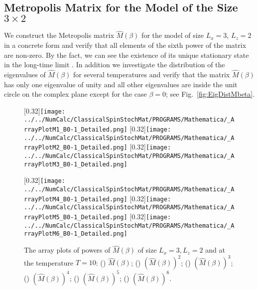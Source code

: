 \subsection{Metropolis Matrix for the Model of the Size $3\times 2$}

We construct the Metropolis matrix $\hat{M}(\beta)$ for the model of size $L_{x}=3$, $L_{z}=2$ in a concrete form and verify that all elements of the sixth power of the matrix are non-zero. By the fact, we can see the existence of its unique stationary state in the long-time limit . In addition we investigate the distribution of the eigenvalues of $\hat{M}(\beta)$ for several temperatures and verify that the matrix $\hat{M}(\beta)$ has only one eigenvalue of unity and all other eigenvalues are inside the unit circle on the complex plane except for the case $\beta=0$; see Fig.~\ref{fig:EigDistMbeta}.

\begin{figure}[htbp]
	\centering
	
	\subcaptionbox{\label{subcap:M1}}[0.32\linewidth]{\texttt{[image: ../../NumCalc/ClassicalSpinStochMat/PROGRAMS/Mathematica/\_ArrayPlotM1\_B0-1\_Detailed.png]}}
	\subcaptionbox{\label{subcap:M2}}[0.32\linewidth]{\texttt{[image: ../../NumCalc/ClassicalSpinStochMat/PROGRAMS/Mathematica/\_ArrayPlotM2\_B0-1\_Detailed.png]}}
	\subcaptionbox{\label{subcap:M3}}[0.32\linewidth]{\texttt{[image: ../../NumCalc/ClassicalSpinStochMat/PROGRAMS/Mathematica/\_ArrayPlotM3\_B0-1\_Detailed.png]}}
	
	\subcaptionbox{\label{subcap:M4}}[0.32\linewidth]{\texttt{[image: ../../NumCalc/ClassicalSpinStochMat/PROGRAMS/Mathematica/\_ArrayPlotM4\_B0-1\_Detailed.png]}}
	\subcaptionbox{\label{subcap:M5}}[0.32\linewidth]{\texttt{[image: ../../NumCalc/ClassicalSpinStochMat/PROGRAMS/Mathematica/\_ArrayPlotM5\_B0-1\_Detailed.png]}}
	\subcaptionbox{\label{subcap:M6}}[0.32\linewidth]{\texttt{[image: ../../NumCalc/ClassicalSpinStochMat/PROGRAMS/Mathematica/\_ArrayPlotM6\_B0-1\_Detailed.png]}}

	\caption{The array plots of powers of $\hat{M}(\beta)$ of size $L_{x}=3, L_{z}=2$ and at the temperature $T=10$: () $\hat{M}(\beta)$; () $\left(\hat{M}(\beta)\right)^{2}$; () $\left(\hat{M}(\beta)\right)^{3}$; () $\left(\hat{M}(\beta)\right)^{4}$; () $\left(\hat{M}(\beta)\right)^{5}$; () $\left(\hat{M}(\beta)\right)^{6}$.}
\end{figure}

